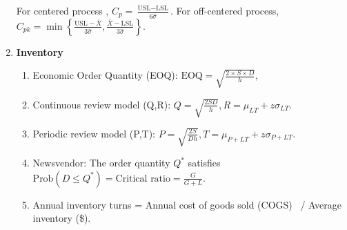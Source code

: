\documentclass[twoside, 12pt]{article}
\def\beginrefs{\begin{list}%
        {[\arabic{equation}]}{\usecounter{equation}
         \setlength{\leftmargin}{2.0truecm}\setlength{\labelsep}{0.4truecm}%
         \setlength{\labelwidth}{1.6truecm}}}
\def\endrefs{\end{list}}
\def\bibentry#1{\item[\hbox{[#1]}]}
\begin{document}
\begin{enumerate}
For centered process , 
		$
		C_p = \frac{\text{USL}-\text{LSL}}{6 \hat{\sigma}}.
		$ For off-centered process, $
		C_{pk} = \min \left\{ \frac{\text{USL} - \overline{X}}{3 \hat{\sigma}},  \frac{\overline{X}-\text{LSL}}{3 \hat{\sigma} } \right\}.
	    $


\item {\bf Inventory}

\begin{enumerate}
	\item Economic Order Quantity (EOQ):
	$
	\text{EOQ} = \sqrt{\frac{2 \times S \times D}{h}},
	$

	\item Continuous review model (Q,R):
	$
	Q =  \sqrt{\frac{2 S D}{h}}, R = \mu_{LT} + z \sigma_{LT}.
	$

	\item Periodic review model (P,T):
    $
	P = \sqrt{ \frac{2S}{Dh}}, T = \mu_{P+LT} + z \sigma_{P+LT}.
	$
	
	\item Newsvendor:
	The order quantity $Q^*$ satisfies
    $
	\text{Prob} (D \leq Q^*) = 	\text{Critical ratio} = \frac{G}{G+L}.
    $
    
    \item Annual inventory turns = Annual cost of goods sold (COGS) \ /  Average inventory (\$).
	
\end{enumerate}



\end{enumerate}














%
%
%
%  
%
\end{document}
